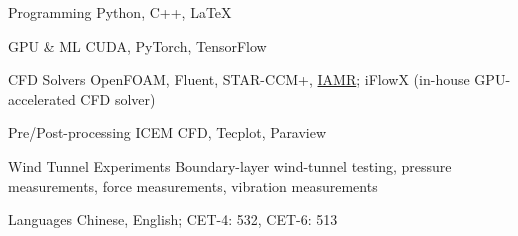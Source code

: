 
\begin{cvskills}
  \cvskill
    {Programming}
    {Python, C++, LaTeX}

  \cvskill
    {GPU \& ML}
    {CUDA, PyTorch, TensorFlow}

  \cvskill
    {CFD Solvers}
    {OpenFOAM, Fluent, STAR-CCM+,
    \href{https://github.com/AMReX-Fluids/IAMR}{\textcolor{referenceblue}{IAMR}};
    \textcolor{referenceblue}{iFlowX} (in-house GPU-accelerated CFD solver)}

  \cvskill
    {Pre/Post-processing}
    {ICEM CFD, Tecplot, Paraview}

  \cvskill
    {Wind Tunnel Experiments}
    {Boundary-layer wind-tunnel testing, pressure measurements, force measurements, vibration measurements}

  \cvskill
    {Languages}
    {Chinese, English; CET-4: 532, CET-6: 513}
\end{cvskills}
